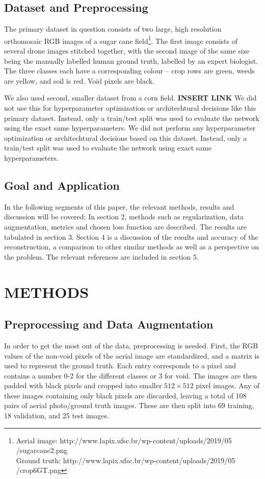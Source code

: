\documentclass{article}
\begin{document}
\subsection{Dataset and Preprocessing}
The primary dataset in question consists of two large, high resolution orthomosaic RGB images of a sugar cane field\footnote{Aerial image: http://www.lapix.ufsc.br/wp-content/uploads/2019/05\\/sugarcane2.png\\
Ground truth: http://www.lapix.ufsc.br/wp-content/uploads/2019/05\\/crop6GT.png}.
The first image consists of several drone images stitched together, with the second image of the same size being the manually labelled human ground truth, labelled by an expert biologist.
The three classes each have a corresponding colour -- crop rows are green, weeds are yellow, and soil is red.
Void pixels are black.

We also used second, smaller dataset from a corn field. \textbf{INSERT LINK}
We did not use this for hyperparameter optimization or architechtural decisions like this primary dataset.
Instead, only a train/test split was used to evaluate the network using the exact same hyperparameters.
We did not perform any hyperparameter optimization or architechtural decisions based on this dataset.
Instead, only a train/test split was used to evaluate the network using exact same hyperparameters.

\subsection{Goal and Application}


In the following segments of this paper, the relevant methods, results and discussion will be covered; In section 2, methods such as regularization, data augmentation, metrics and chosen loss function are described. The results are tabulated in section 3. Section 4 is a discussion of the results and accuracy of the reconstruction, a comparison to other similar methods as well as a perspective on the problem. The relevant references are included in section 5.

\section{METHODS}
\label{sec:format}

\subsection{Preprocessing and Data Augmentation}
In order to get the most out of the data, preprocessing is needed.
First, the RGB values of the non-void pixels of the aerial image are standardized, and a matrix is used to represent the ground truth.
Each entry corresponds to a pixel and contains a number 0-2 for the different classes or 3 for void.
The images are then padded with black pixels and cropped into smaller $ 512\times 512 $ pixel images.
Any of these images containing only black pixels are discarded, leaving a total of 108 pairs of aerial photo/ground truth images.
These are then split into 69 training, 18 validation, and 25 test images.
\end{document}
